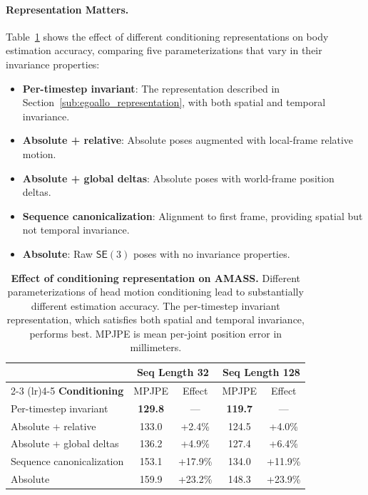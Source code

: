 \documentclass[../../book-main.tex]{subfiles}
\begin{document}
\paragraph{Representation Matters.}
Table~\ref{tab:egoallo_cond_ablation} shows the effect of different
conditioning representations on body estimation accuracy, comparing
five parameterizations that vary in their invariance properties:
\begin{itemize}
\item \textbf{Per-timestep invariant}: The representation
described in Section~\ref{sub:egoallo_representation}, with
both spatial and temporal invariance.
\item \textbf{Absolute + relative}: Absolute poses augmented with
local-frame relative motion.
\item \textbf{Absolute + global deltas}: Absolute poses with
world-frame position deltas.
\item \textbf{Sequence canonicalization}: Alignment to first
frame, providing spatial but not temporal invariance.
\item \textbf{Absolute}: Raw $\mathsf{SE}(3)$ poses with no
invariance properties.
\end{itemize}

\begin{table}[t]
\centering
\caption{\textbf{Effect of conditioning representation on AMASS.}
Different parameterizations of head motion conditioning lead to
substantially different estimation accuracy. The per-timestep
invariant representation, which satisfies both spatial and
temporal invariance, performs best. MPJPE is mean per-joint
position error in millimeters.}
\label{tab:egoallo_cond_ablation}
\small
\begin{tabular}{lcccc}
\toprule
& \multicolumn{2}{c}{\textbf{Seq Length 32}} &
\multicolumn{2}{c}{\textbf{Seq Length 128}} \\
\cmidrule(lr){2-3} \cmidrule(lr){4-5}
\textbf{Conditioning} & MPJPE & Effect & MPJPE & Effect \\
\midrule
Per-timestep invariant & \textbf{129.8} & --- & \textbf{119.7} & --- \\
Absolute + relative & 133.0 & +2.4\% & 124.5 & +4.0\% \\
Absolute + global deltas & 136.2 & +4.9\% & 127.4 & +6.4\% \\
Sequence canonicalization & 153.1 & +17.9\% & 134.0 & +11.9\% \\
Absolute & 159.9 & +23.2\% & 148.3 & +23.9\% \\
\bottomrule
\end{tabular}
\end{table}
\end{document}
